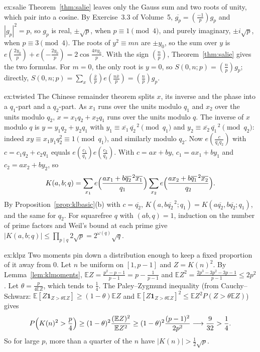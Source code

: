 \begin{solution}{ex:salie}
\idea Theorem~\ref{thm:salie} leaves only the Gauss sum and two roots of unity, which pair into a cosine.
\writeup By Exercise~3.3 of Volume~5, $\overline{g_p}=(\frac{-1}p)g_p$ and $|g_p|^2=p$, so $g_p$ is real, $\pm\sqrt p$, when $p\equiv1\pmod4$, and purely imaginary, $\pm i\sqrt p$, when $p\equiv3\pmod4$. The roots of $y^2\equiv mn$ are $\pm y_0$, so the sum over $y$ is $e(\frac{2y_0}p)+e(-\frac{2y_0}p)=2\cos\frac{4\pi y_0}p$. With the sign $(\frac np)$, Theorem~\ref{thm:salie} gives the two formulas. For $m=0$, the only root is $y=0$, so $S(0,n;p)=(\frac np)g_p$; directly, $S(0,n;p)=\sum_x(\frac{\overline x}p)e(\frac{n\overline x}p)=(\frac np)g_p$.
\end{solution}

\begin{solution}{ex:twisted}
\idea The Chinese remainder theorem splits $x$, its inverse and the phase into a $q_1$-part and a $q_2$-part.
\writeup As $x_1$ runs over the units modulo $q_1$ and $x_2$ over the units modulo $q_2$, $x=x_1q_2+x_2q_1$ runs over the units modulo $q$. The inverse of $x$ modulo $q$ is $y=y_1q_2+y_2q_1$ with $y_1\equiv\overline{x_1}\,\overline{q_2}^{\,2}\pmod{q_1}$ and $y_2\equiv\overline{x_2}\,\overline{q_1}^{\,2}\pmod{q_2}$: indeed $xy\equiv x_1y_1q_2^2\equiv1\pmod{q_1}$, and similarly modulo $q_2$. Now $e(\frac c{q_1q_2})$ with $c=c_1q_2+c_2q_1$ equals $e(\frac{c_1}{q_1})e(\frac{c_2}{q_2})$. With $c=ax+by$, $c_1=ax_1+by_1$ and $c_2=ax_2+by_2$, so
\[
K(a,b;q)=\sum_{x_1}e\Bigl(\frac{ax_1+b\overline{q_2}^{\,2}\overline{x_1}}{q_1}\Bigr)\sum_{x_2}e\Bigl(\frac{ax_2+b\overline{q_1}^{\,2}\overline{x_2}}{q_2}\Bigr).
\]
By Proposition~\ref{prop:klbasic}(b) with $c=\overline{q_2}$, $K(a,b\overline{q_2}^{\,2};q_1)=K(a\overline{q_2},b\overline{q_2};q_1)$, and the same for $q_2$. For squarefree $q$ with $(ab,q)=1$, induction on the number of prime factors and Weil's bound at each prime give $|K(a,b;q)|\le\prod_{p\mid q}2\sqrt p=2^{\omega(q)}\sqrt q$.
\end{solution}

\begin{solution}{ex:klpz}
\idea Two moments pin down a distribution enough to keep a fixed proportion of it away from $0$.
\writeup Let $n$ be uniform on $[1,p-1]$ and $Z=K(n)^2$. By Lemma~\ref{lem:klmoments}, $\mathbb EZ=\frac{p^2-p-1}{p-1}=p-\frac1{p-1}$ and $\mathbb EZ^2=\frac{2p^3-3p^2-3p-1}{p-1}\le2p^2$. Let $\theta=\frac p{4\mathbb EZ}$, which tends to $\frac14$. The Paley--Zygmund inequality (from Cauchy--Schwarz: $\mathbb E[Z\mathbf 1_{Z>\theta\mathbb EZ}]\ge(1-\theta)\mathbb EZ$ and $\mathbb E[Z\mathbf 1_{Z>\theta\mathbb EZ}]^2\le\mathbb EZ^2P(Z>\theta\mathbb EZ)$) gives
\[
P\Bigl(K(n)^2>\frac p4\Bigr)\ge(1-\theta)^2\frac{(\mathbb EZ)^2}{\mathbb EZ^2}\ge(1-\theta)^2\frac{(p-1)^2}{2p^2}\longrightarrow\frac9{32}>\frac14.
\]
So for large $p$, more than a quarter of the $n$ have $|K(n)|>\frac12\sqrt p$.
\end{solution}


